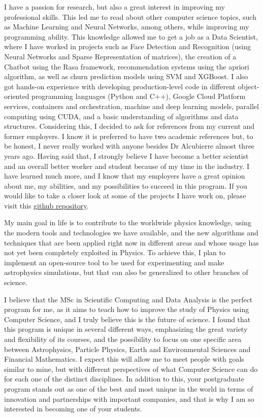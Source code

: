 \documentclass{article}
\begin{document}
I have a passion for research, but also a great interest in improving my professional skills. This led me to read about other computer science topics, such as Machine Learning and Neural Networks, among others, while improving my programming ability. This knowledge allowed me to get a job as a Data Scientist, where I have worked in projects such as Face Detection and Recognition (using Neural Networks and Sparse Representation of matrices), the creation of a Chatbot using the Rasa framework, recommendation systems using the apriori algorithm, as well as churn prediction models using SVM and XGBoost. I also got hands-on experience with developing production-level code in different object-oriented programming languages (Python and C++), Google Cloud Platform services, containers and orchestration, machine and deep learning models, parallel computing using CUDA, and a basic understanding of algorithms and data structures. Considering this, I decided to ask for references from my current and former employers. I know it is preferred to have two academic references but, to be honest, I never really worked with anyone besides Dr Alcubierre almost three years ago. Having said that, I strongly believe I have become a better scientist and an overall better worker and student because of my time in the industry. I have learned much more, and I know that my employers have a great opinion about me, my abilities, and my possibilities to succeed in this program. If you would like to take a closer look at some of the projects I have work on, please visit this \href{https://github.com/uzmargomez/master_degree}{github repository}. 

My main goal in life is to contribute to the worldwide physics knowledge, using the modern tools and technologies we have available, and the new algorithms and techniques that are been applied right now in different areas and whose usage has not yet been completely exploited in Physics. To achieve this, I plan to implement an open-source tool to be used for experimenting and make astrophysics simulations, but that can also be generalized to other branches of science.

I believe that the MSc in Scientific Computing and Data Analysis is the perfect program for me, as it aims to teach how to improve the study of Physics using Computer Science, and I truly believe this is the future of science. I found that this program is unique in several different ways, emphasizing the great variety and flexibility of its courses, and the possibility to focus on one specific area between Astrophysics, Particle Physics, Earth and Environmental Sciences and Financial Mathematics. I expect this will allow me to meet people with goals similar to mine, but with different perspectives of what Computer Science can do for each one of the distinct disciplines. In addition to this, your postgraduate program stands out as one of the best and most unique in the world in terms of innovation and partnerships with important companies, and that is why I am so interested in becoming one of your students.
\end{document}
